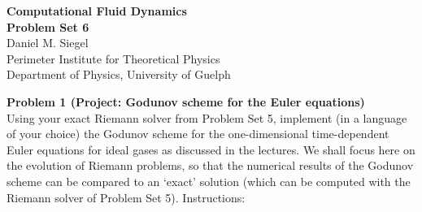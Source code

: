\documentclass[letter,11pt]{article}
\begin{document}
\pagestyle{problem_set}


\phantom{.}
\begin{center}
{\Large\textbf{Computational Fluid Dynamics\\[0.4cm] Problem Set 6}} \\[0.7cm]
Daniel M. Siegel \\[0.1cm]
Perimeter Institute for Theoretical Physics\\
Department of Physics, University of Guelph
\end{center}

\vspace{1cm}


{\noindent\large\textbf{Problem 1 (Project: Godunov scheme for the Euler equations)}}\\[0.1cm]

\noindent Using your exact Riemann solver from Problem Set 5, implement (in a language of your choice) the Godunov scheme for the one-dimensional time-dependent Euler equations for ideal gases as discussed in the lectures. We shall focus here on the evolution of Riemann problems, so that the numerical results of the Godunov scheme can be compared to an `exact' solution (which can be computed with the Riemann solver of Problem Set 5). Instructions:
\end{document}
